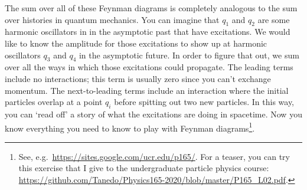The sum over all of these Feynman diagrams is completely analogous to the sum over histories in quantum mechanics. You can imagine that $q_1$ and $q_2$ are some harmonic oscillators in in the asymptotic past that have excitations. We would like to know the amplitude for those excitations to show up at harmonic oscillators $q_3$ and $q_4$ in the asymptotic future. In order to figure that out, we sum over all the ways in which those excitations could propagate. The leading terms include no interactions; this term is usually zero since you can't exchange momentum. The next-to-leading terms include an interaction where the initial particles overlap at a point $q_i$ before spitting out two new particles. In this way, you can `read off' a story of what the excitations are doing in spacetime. Now you know everything you need to know to play with Feynman diagrams\footnote{See, e.g.~\url{https://sites.google.com/ucr.edu/p165/}. For a teaser, you can try this exercise that I give to the undergraduate particle physics course: \url{https://github.com/Tanedo/Physics165-2020/blob/master/P165_L02.pdf}.}.








 















